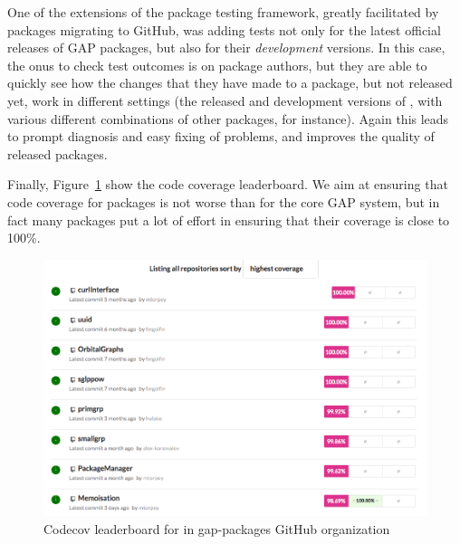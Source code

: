 One of the extensions of the package testing framework, greatly 
facilitated by packages migrating to GitHub, was adding tests not
only for the latest official releases of GAP packages, but also
for their \emph{development} versions.
In this case, the onus to check test outcomes is on package authors,
but they are able to quickly see how the changes that they have made to
a package, but not released yet, work in different settings (the
released and development versions of \GAP, with various different
combinations of other packages, for instance). Again this leads to
prompt diagnosis and easy fixing of problems, and improves the quality
of released packages.



Finally, Figure~\ref{fig:gap-packages-codecov} show the code coverage
leaderboard. We aim at ensuring that code coverage for packages is 
not worse than for the core GAP system, but in fact many packages
put a lot of effort in ensuring that their coverage is close to 100\%. 

\begin{figure}[!ht]
    \centering
    \includegraphics[width=\textwidth]{images/gap-packages-codecov}
    \caption{Codecov leaderboard for in gap-packages GitHub organization}
    \label{fig:gap-packages-codecov}
\end{figure}

